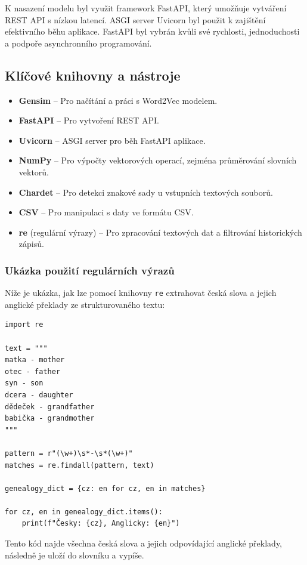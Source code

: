 \documentclass[czech, ba, kiv, he]{fasthesis}
\begin{document}
K nasazení modelu byl využit framework FastAPI, který umožňuje vytváření REST API s nízkou latencí. ASGI server Uvicorn byl použit k zajištění efektivního běhu aplikace. FastAPI byl vybrán kvůli své rychlosti, jednoduchosti a podpoře asynchronního programování.

\subsection{Klíčové knihovny a nástroje}
\begin{itemize}
    \item \textbf{Gensim} – Pro načítání a práci s Word2Vec modelem.
    \item \textbf{FastAPI} – Pro vytvoření REST API.
    \item \textbf{Uvicorn} – ASGI server pro běh FastAPI aplikace.
    \item \textbf{NumPy} – Pro výpočty vektorových operací, zejména průměrování slovních vektorů.
    \item \textbf{Chardet} – Pro detekci znakové sady u vstupních textových souborů.
    \item \textbf{CSV} – Pro manipulaci s daty ve formátu CSV.
    \item \textbf{re} (regulární výrazy) – Pro zpracování textových dat a filtrování historických zápisů.
\end{itemize}

\subsubsection*{Ukázka použití regulárních výrazů}  
Níže je ukázka, jak lze pomocí knihovny \texttt{re} extrahovat česká slova a jejich anglické překlady ze strukturovaného textu:  

\begin{lstlisting}[caption={Ukázka použítí regulárních výrazů}]
import re

text = """
matka - mother
otec - father
syn - son
dcera - daughter
dědeček - grandfather
babička - grandmother
"""

pattern = r"(\w+)\s*-\s*(\w+)"  
matches = re.findall(pattern, text)

genealogy_dict = {cz: en for cz, en in matches}

for cz, en in genealogy_dict.items():
    print(f"Česky: {cz}, Anglicky: {en}")
\end{lstlisting}

Tento kód najde všechna česká slova a jejich odpovídající anglické překlady, následně je uloží do slovníku a vypíše.
\end{document}
